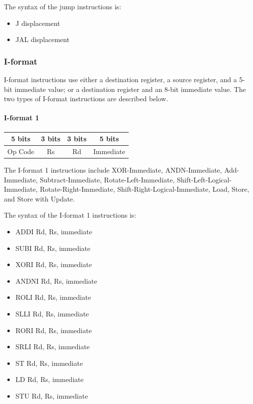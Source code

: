 \documentclass[11pt]{article}
\begin{document}
The syntax of the jump instructions is:
\begin{itemize}
\item J displacement
\item JAL displacement
\end{itemize}

\subsubsection{I-format}
I-format instructions use either a destination register, a source register, and a 5-bit immediate value; or a destination register and an 8-bit immediate value. The two types of I-format instructions are described below.

\paragraph{I-format 1}
\begin{center}
\begin{tabular}{|c|c|c|c|}
\hline
5 bits & 3 bits & 3 bits & 5 bits \\
\hline
\hline
Op Code & Rs & Rd & Immediate \\
\hline
\hline
\end{tabular}
\end{center}

The I-format 1 instructions include XOR-Immediate, ANDN-Immediate, Add-Immediate, Subtract-Immediate, Rotate-Left-Immediate, Shift-Left-Logical-Immediate, Rotate-Right-Immediate, Shift-Right-Logical-Immediate, Load, Store, and Store with Update.

The syntax of the I-format 1 instructions is:
\begin{itemize}
\item ADDI Rd, Rs, immediate
\item SUBI Rd, Rs, immediate
\item XORI Rd, Rs, immediate
\item ANDNI Rd, Rs, immediate
\item ROLI Rd, Rs, immediate
\item SLLI Rd, Rs, immediate
\item RORI Rd, Rs, immediate
\item SRLI Rd, Rs, immediate
\item ST Rd, Rs, immediate
\item LD Rd, Rs, immediate
\item STU Rd, Rs, immediate
\end{itemize}
\end{document}
